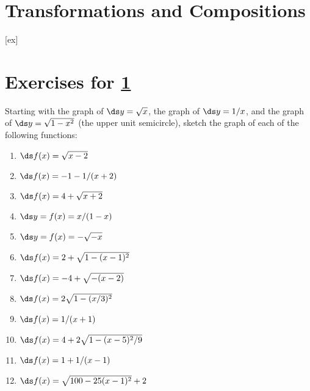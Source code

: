\section{Transformations and Compositions}\label{sec:Transformations}




[ex]
\section*{Exercises for \ref{sec:Transformations}}

\begin{enumialphparenastyle}

\begin{ex}
Starting with the graph of $\ds y=\sqrt{x}$, the graph of $\ds y=1/x$, and the
graph of $\ds y=\sqrt{1-x^2}$ (the upper unit semicircle), sketch the
graph of each of the following functions:
\begin{multicols}{2}
\begin{enumerate}
	\item	$\ds f(x)=\sqrt{x-2}$
	\item	$\ds f(x)=-1-1/(x+2)$
	\item	$\ds f(x)=4+\sqrt{x+2}$
	\item	$\ds y=f(x)=x/(1-x)$
	\item	$\ds y=f(x)=-\sqrt{-x}$
	\item	$\ds f(x)=2+\sqrt{1-(x-1)^2}$
	\item	$\ds f(x)=-4+\sqrt{-(x-2)}$
	\item	$\ds f(x)=2\sqrt{1-(x/3)^2}$
	\item	$\ds f(x)=1/(x+1)$
	\item	$\ds f(x)=4+2\sqrt{1-(x-5)^2/9}$
	\item	$\ds f(x)=1+1/(x-1)$
	\item	$\ds f(x)=\sqrt{100-25(x-1)^2}+2$
\end{enumerate}
\end{multicols}
\end{ex}


\end{enumialphparenastyle}
